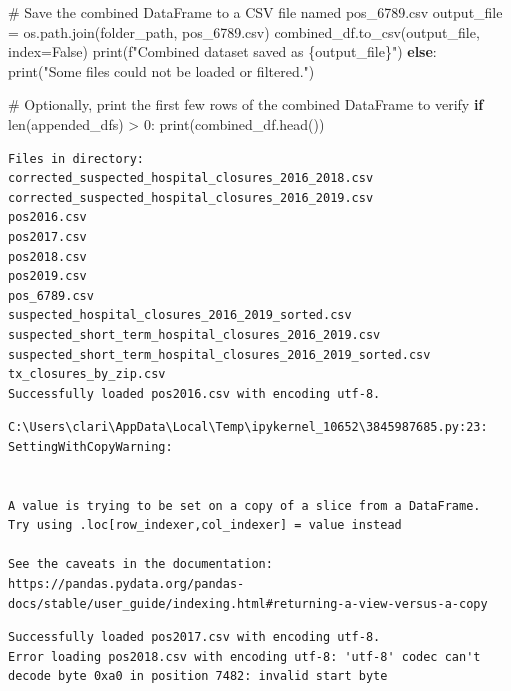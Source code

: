 \documentclass[
  letterpaper,
  DIV=11,
  numbers=noendperiod]{scrartcl}
\newenvironment{Shaded}{\begin{snugshade}}{\end{snugshade}}
\newcommand{\BuiltInTok}[1]{\textcolor[rgb]{0.00,0.23,0.31}{#1}}
\newcommand{\CommentTok}[1]{\textcolor[rgb]{0.37,0.37,0.37}{#1}}
\newcommand{\ControlFlowTok}[1]{\textcolor[rgb]{0.00,0.23,0.31}{\textbf{#1}}}
\newcommand{\DecValTok}[1]{\textcolor[rgb]{0.68,0.00,0.00}{#1}}
\newcommand{\NormalTok}[1]{\textcolor[rgb]{0.00,0.23,0.31}{#1}}
\newcommand{\OperatorTok}[1]{\textcolor[rgb]{0.37,0.37,0.37}{#1}}
\newcommand{\SpecialCharTok}[1]{\textcolor[rgb]{0.37,0.37,0.37}{#1}}
\newcommand{\SpecialStringTok}[1]{\textcolor[rgb]{0.13,0.47,0.30}{#1}}
\newcommand{\StringTok}[1]{\textcolor[rgb]{0.13,0.47,0.30}{#1}}
\newcommand{\VariableTok}[1]{\textcolor[rgb]{0.07,0.07,0.07}{#1}}
\begin{document}
\begin{Shaded}
\begin{Highlighting}[]
    \CommentTok{\# Save the combined DataFrame to a CSV file named \textquotesingle{}pos\_6789.csv\textquotesingle{}}
\NormalTok{    output\_file }\OperatorTok{=}\NormalTok{ os.path.join(folder\_path, }\StringTok{\textquotesingle{}pos\_6789.csv\textquotesingle{}}\NormalTok{)}
\NormalTok{    combined\_df.to\_csv(output\_file, index}\OperatorTok{=}\VariableTok{False}\NormalTok{)}
    \BuiltInTok{print}\NormalTok{(}\SpecialStringTok{f"Combined dataset saved as }\SpecialCharTok{\{}\NormalTok{output\_file}\SpecialCharTok{\}}\SpecialStringTok{"}\NormalTok{)}
\ControlFlowTok{else}\NormalTok{:}
    \BuiltInTok{print}\NormalTok{(}\StringTok{"Some files could not be loaded or filtered."}\NormalTok{)}

\CommentTok{\# Optionally, print the first few rows of the combined DataFrame to verify}
\ControlFlowTok{if} \BuiltInTok{len}\NormalTok{(appended\_dfs) }\OperatorTok{\textgreater{}} \DecValTok{0}\NormalTok{:}
    \BuiltInTok{print}\NormalTok{(combined\_df.head())}
\end{Highlighting}
\end{Shaded}

\begin{verbatim}
Files in directory:
corrected_suspected_hospital_closures_2016_2018.csv
corrected_suspected_hospital_closures_2016_2019.csv
pos2016.csv
pos2017.csv
pos2018.csv
pos2019.csv
pos_6789.csv
suspected_hospital_closures_2016_2019_sorted.csv
suspected_short_term_hospital_closures_2016_2019.csv
suspected_short_term_hospital_closures_2016_2019_sorted.csv
tx_closures_by_zip.csv
Successfully loaded pos2016.csv with encoding utf-8.
\end{verbatim}

\begin{verbatim}
C:\Users\clari\AppData\Local\Temp\ipykernel_10652\3845987685.py:23: SettingWithCopyWarning:


A value is trying to be set on a copy of a slice from a DataFrame.
Try using .loc[row_indexer,col_indexer] = value instead

See the caveats in the documentation: https://pandas.pydata.org/pandas-docs/stable/user_guide/indexing.html#returning-a-view-versus-a-copy
\end{verbatim}

\begin{verbatim}
Successfully loaded pos2017.csv with encoding utf-8.
Error loading pos2018.csv with encoding utf-8: 'utf-8' codec can't decode byte 0xa0 in position 7482: invalid start byte
\end{verbatim}
\end{document}

